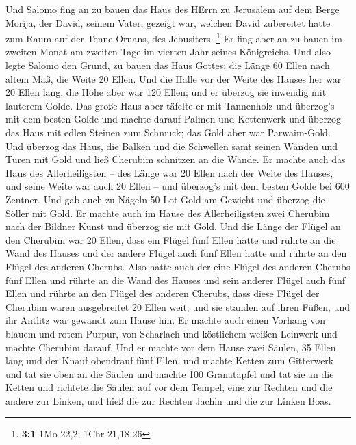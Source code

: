 Und Salomo fing an zu bauen das Haus des HErrn zu
Jerusalem auf dem Berge Morija, der David, seinem Vater, gezeigt war,
welchen David zubereitet hatte zum Raum auf der Tenne Ornans, des
Jebusiters. \footnote{\textbf{3:1} 1Mo 22,2; 1Chr 21,18-26}
 Er fing aber an zu bauen im zweiten Monat am zweiten Tage
im vierten Jahr seines Königreichs.  Und also legte Salomo
den Grund, zu bauen das Haus Gottes: die Länge 60 Ellen nach altem Maß,
die Weite 20 Ellen.  Und die Halle vor der Weite des
Hauses her war 20 Ellen lang, die Höhe aber war 120 Ellen; und er
überzog sie inwendig mit lauterem Golde.  Das große Haus
aber täfelte er mit Tannenholz und überzog's mit dem besten Golde und
machte darauf Palmen und Kettenwerk  und überzog das Haus
mit edlen Steinen zum Schmuck; das Gold aber war Parwaim-Gold.
 Und überzog das Haus, die Balken und die Schwellen samt
seinen Wänden und Türen mit Gold und ließ Cherubim schnitzen an die
Wände.  Er machte auch das Haus des Allerheiligsten -- des
Länge war 20 Ellen nach der Weite des Hauses, und seine Weite war auch
20 Ellen -- und überzog's mit dem besten Golde bei 600 Zentner.
 Und gab auch zu Nägeln 50 Lot Gold am Gewicht und überzog
die Söller mit Gold.  Er machte auch im Hause des
Allerheiligsten zwei Cherubim nach der Bildner Kunst und überzog sie mit
Gold.  Und die Länge der Flügel an den Cherubim war 20
Ellen, dass ein Flügel fünf Ellen hatte und rührte an die Wand des
Hauses und der andere Flügel auch fünf Ellen hatte und rührte an den
Flügel des anderen Cherubs.  Also hatte auch der eine
Flügel des anderen Cherubs fünf Ellen und rührte an die Wand des Hauses
und sein anderer Flügel auch fünf Ellen und rührte an den Flügel des
anderen Cherubs,  dass diese Flügel der Cherubim waren
ausgebreitet 20 Ellen weit; und sie standen auf ihren Füßen, und ihr
Antlitz war gewandt zum Hause hin.  Er machte auch einen
Vorhang von blauem und rotem Purpur, von Scharlach und köstlichem weißen
Leinwerk und machte Cherubim darauf.  Und er machte vor
dem Hause zwei Säulen, 35 Ellen lang und der Knauf obendrauf fünf Ellen,
 und machte Ketten zum Gitterwerk und tat sie oben an die
Säulen und machte 100 Granatäpfel und tat sie an die Ketten
 und richtete die Säulen auf vor dem Tempel, eine zur
Rechten und die andere zur Linken, und hieß die zur Rechten Jachin und
die zur Linken Boas.

